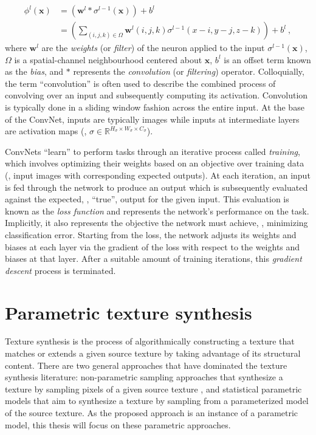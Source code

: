 \begin{equation}
	\begin{aligned}
		\phi^l(\mathbf{x}) &= \left(\mathbf{w}^l * \sigma^{l-1}(\mathbf{x})\right) + b^l\\
		&= \left(\sum_{(i, j, k) \in \Omega} \mathbf{w}^l(i, j, k) \sigma^{l-1}(x - i, y - j, z - k)\right) + b^l\ ,
	\end{aligned}
\end{equation}
where $\mathbf{w}^l$ are the \emph{weights} (or \emph{filter}) of the neuron applied to the input $\sigma^{l-1}(\mathbf{x})$, $\Omega$ is a spatial-channel neighbourhood centered about $\mathbf{x}$, $b^l$ is an offset term known as the \emph{bias}, and $\ast$ represents the \emph{convolution} (or \emph{filtering}) operator. Colloquially, the term ``convolution'' is often used to describe the combined process of convolving over an input and subsequently computing its activation. Convolution is typically done in a sliding window fashion across the entire input. At the base of the ConvNet, inputs are typically images while inputs at intermediate layers are activation maps (\eg, $\sigma \in \mathbb{R}^{H_\sigma \times W_\sigma \times C_\sigma}$). 

ConvNets ``learn'' to perform tasks through an iterative process called \emph{training}, which involves optimizing their weights based on an objective over training data (\eg, input images with corresponding expected outputs). At each iteration, an input is fed through the network to produce an output which is subsequently evaluated against the expected, \ie, ``true'', output for the given input. This evaluation is known as the \emph{loss function} and represents the network's performance on the task. Implicitly, it also represents the objective the network must achieve, \eg, minimizing classification error. Starting from the loss, the network adjusts its weights and biases at each layer via the gradient of the loss with respect to the weights and biases at that layer. After a suitable amount of training iterations, this \emph{gradient descent} process is terminated.

\section{Parametric texture synthesis}

Texture synthesis is the process of algorithmically constructing a texture that
matches or extends a given source texture by taking advantage of its structural 
content. There are two general approaches that have dominated the texture
synthesis literature: non-parametric sampling approaches that
synthesize a texture by sampling pixels of a given source texture
\cite{efros1999,kwatra2003graphcut,schodl2000,wei2000}, and 
statistical parametric models that aim to synthesize a texture by sampling
from a parameterized model of the source texture.
As the proposed approach is an instance of a parametric model, this thesis 
will focus on these parametric approaches.

